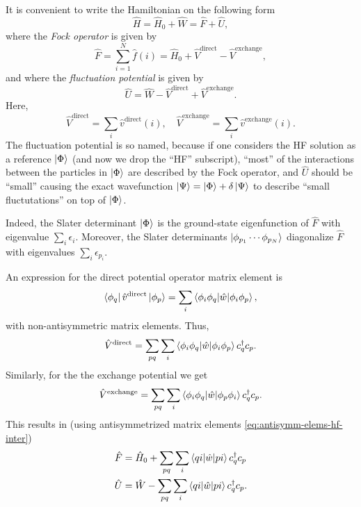 \documentclass{report}
\theoremstyle{plain}
\theoremstyle{definition}
\begin{document}
 It is
convenient to write the Hamiltonian on the following form
\begin{equation}
  \hat{H} = \hat{H}_0 + \hat{W} = \hat{F} + \hat{U},
\end{equation}
where the \emph{Fock operator} is given by
\begin{equation}
  \hat{F} = \sum_{i=1}^N \hat{f}(i) = \hat{H}_0 +
  \hat{V}^\text{direct} - \hat{V}^\text{exchange},
\end{equation}
and where the \emph{fluctuation potential} is given by
\begin{equation}
  \hat{U} = \hat{W} - \hat{V}^\text{direct} + \hat{V}^\text{exchange}.
\end{equation}
Here,
\begin{equation}
  \hat{V}^\text{direct} = \sum_i \hat{v}^\text{direct}(i), \quad
  \hat{V}^\text{exchange} = \sum_i \hat{v}^\text{exchange}(i). 
\end{equation}
The fluctuation potential is so named, because if one considers the HF
solution as a reference $\ket{\Phi}$ (and now we drop the ``HF''
subscript), ``most'' of the interactions between the particles in
$\ket{\Phi}$ are described by the Fock operator, and
$\hat{U}$ should be ``small'' causing the exact wavefunction
$\ket{\Psi} = \ket{\Phi} + \delta\ket{\Psi}$ to describe
``small fluctutations'' on top of $\ket{\Phi}$.

Indeed, the Slater determinant $\ket{\Phi}$ is the
ground-state eigenfunction of $\hat{F}$ with eigenvalue $\sum_i
\epsilon_i$. Moreover, the Slater determinants
$\ket{\phi_{p_1}\cdots \phi_{p_N}}$ diagonalize $\hat{F}$ with
eigenvalues $\sum_i \epsilon_{p_i}$. 

An expression for the direct potential operator matrix element is
\begin{equation}
  \bra{\phi_q} \hat{v}^\text{direct} \ket{\phi_p} = \sum_{i}
  \braket{\phi_i\phi_q|\hat{w}|\phi_i \phi_p},
\end{equation}
with non-antisymmetric matrix elements. Thus,
\begin{equation}
  \hat{V}^\text{direct} = \sum_{pq} \sum_{i}
  \braket{\phi_i\phi_q|\hat{w}|\phi_i \phi_p} c^\dag_q c_p.
\end{equation}
Similarly, for the the exchange potential we get
\begin{equation}
  \hat{V}^\text{exchange} = \sum_{pq} \sum_{i}
  \braket{\phi_i\phi_q|\hat{w}|\phi_p\phi_i} c^\dag_q c_p.
\end{equation}
This results in (using antisymmetrized matrix elements \eqref{eq:antisymm-elems-hf-inter})
\begin{align}
  \hat{F} &= \hat{H}_0 + \sum_{pq}\sum_i \braket{qi|\hat{w}|pi}
  c^\dag_q c_p \\
  \hat{U} &= \hat{W} - \sum_{pq}\sum_i \braket{qi|\hat{w}|pi}
  c^\dag_q c_p.  
\end{align}
\end{document}
